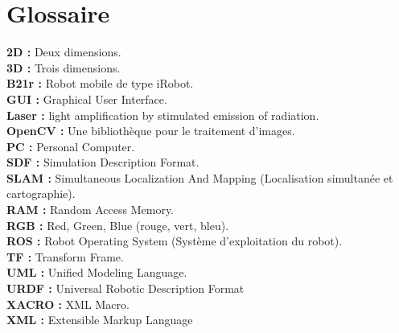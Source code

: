 \chapter*{Glossaire}%
\label{Chapter5} %


\textbf{2D :} Deux dimensions.\vspace{5px}\\
\textbf{3D :} Trois dimensions.\vspace{5px}\\
\textbf{B21r :} Robot mobile de type iRobot.\vspace{5px}\\
\textbf{GUI :} Graphical User Interface.\vspace{5px}\\
\textbf{Laser : }light amplification by stimulated emission of radiation.\vspace{5px}\\
\textbf{OpenCV :} Une bibliothèque pour le traitement d’images. \vspace{5px}\\
\textbf{PC :} Personal Computer.\vspace{5px}\\
\textbf{SDF :} Simulation Description Format. \vspace{5px}\\
\textbf{SLAM :} Simultaneous Localization And Mapping (Localisation simultanée et cartographie).\vspace{5px}\\
\textbf{RAM :} Random Access Memory.\vspace{5px}\\
\textbf{RGB :} Red, Green, Blue (rouge, vert, bleu).\vspace{5px}\\
\textbf{ROS :} Robot Operating System (Système d’exploitation du robot).\vspace{5px}\\
\textbf{TF :} Transform Frame.\vspace{5px}\\
\textbf{UML :} Unified Modeling Language. \vspace{5px}\\
\textbf{URDF :} Universal Robotic Description Format \vspace{5px}\\
\textbf{XACRO :} XML Macro. \vspace{5px}\\
\textbf{XML :}  Extensible Markup Language \vspace{5px}\\



